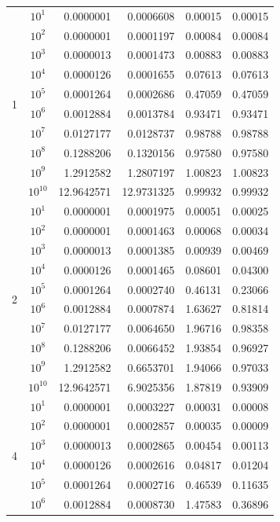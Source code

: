 \documentclass[11pt,a4paper]{article}
\begin{document}
\begin{longtable}{ccrrrr}
\multirow{10}{*}{1} 
 & $10^1$ & 0.0000001 & 0.0006608 & 0.00015 & 0.00015 \\
 & $10^2$ & 0.0000001 & 0.0001197 & 0.00084 & 0.00084 \\
 & $10^3$ & 0.0000013 & 0.0001473 & 0.00883 & 0.00883 \\
 & $10^4$ & 0.0000126 & 0.0001655 & 0.07613 & 0.07613 \\
 & $10^5$ & 0.0001264 & 0.0002686 & 0.47059 & 0.47059 \\
 & $10^6$ & 0.0012884 & 0.0013784 & 0.93471 & 0.93471 \\
 & $10^7$ & 0.0127177 & 0.0128737 & 0.98788 & 0.98788 \\
 & $10^8$ & 0.1288206 & 0.1320156 & 0.97580 & 0.97580 \\
 & $10^9$ & 1.2912582 & 1.2807197 & 1.00823 & 1.00823 \\
 & $10^{10}$ & 12.9642571 & 12.9731325 & 0.99932 & 0.99932 \\ \hline
\multirow{10}{*}{2} 
 & $10^1$ & 0.0000001 & 0.0001975 & 0.00051 & 0.00025 \\
 & $10^2$ & 0.0000001 & 0.0001463 & 0.00068 & 0.00034 \\
 & $10^3$ & 0.0000013 & 0.0001385 & 0.00939 & 0.00469 \\
 & $10^4$ & 0.0000126 & 0.0001465 & 0.08601 & 0.04300 \\
 & $10^5$ & 0.0001264 & 0.0002740 & 0.46131 & 0.23066 \\
 & $10^6$ & 0.0012884 & 0.0007874 & 1.63627 & 0.81814 \\
 & $10^7$ & 0.0127177 & 0.0064650 & 1.96716 & 0.98358 \\
 & $10^8$ & 0.1288206 & 0.0066452 & 1.93854 & 0.96927 \\
 & $10^9$ & 1.2912582 & 0.6653701 & 1.94066 & 0.97033 \\
 & $10^{10}$ & 12.9642571 & 6.9025356 & 1.87819 & 0.93909 \\ \hline
\multirow{10}{*}{4} 
 & $10^1$ & 0.0000001 & 0.0003227 & 0.00031 & 0.00008 \\
 & $10^2$ & 0.0000001 & 0.0002857 & 0.00035 & 0.00009 \\
 & $10^3$ & 0.0000013 & 0.0002865 & 0.00454 & 0.00113 \\
 & $10^4$ & 0.0000126 & 0.0002616 & 0.04817 & 0.01204 \\
 & $10^5$ & 0.0001264 & 0.0002716 & 0.46539 & 0.11635 \\
 & $10^6$ & 0.0012884 & 0.0008730 & 1.47583 & 0.36896 \\

\end{longtable}
\end{document}
